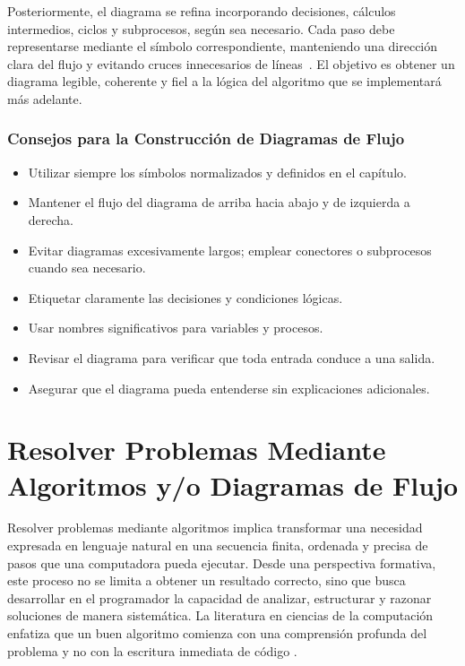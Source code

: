 \documentclass[12pt,twoside]{book}
\begin{document}
							Posteriormente, el diagrama se refina incorporando decisiones, cálculos intermedios, ciclos y subprocesos, según sea necesario. Cada paso debe representarse mediante el símbolo correspondiente, manteniendo una dirección clara del flujo y evitando cruces innecesarios de líneas~\cite{Stevens1974Structured}. El objetivo es obtener un diagrama legible, coherente y fiel a la lógica del algoritmo que se implementará más adelante.
						
						\subsubsection{Consejos para la Construcción de Diagramas de Flujo}
						
							\begin{itemize}
								\item Utilizar siempre los símbolos normalizados y definidos en el capítulo.
								\item Mantener el flujo del diagrama de arriba hacia abajo y de izquierda a derecha.
								\item Evitar diagramas excesivamente largos; emplear conectores o subprocesos cuando sea necesario.
								\item Etiquetar claramente las decisiones y condiciones lógicas.
								\item Usar nombres significativos para variables y procesos.
								\item Revisar el diagrama para verificar que toda entrada conduce a una salida.
								\item Asegurar que el diagrama pueda entenderse sin explicaciones adicionales.
							\end{itemize}
				
				\section{Resolver Problemas Mediante Algoritmos y/o Diagramas de Flujo}
					\noindent
					Resolver problemas mediante algoritmos implica transformar una necesidad expresada en lenguaje natural en una secuencia finita, ordenada y precisa de pasos que una computadora pueda ejecutar. Desde una perspectiva formativa, este proceso no se limita a obtener un resultado correcto, sino que busca desarrollar en el programador la capacidad de analizar, estructurar y razonar soluciones de manera sistemática. La literatura en ciencias de la computación enfatiza que un buen algoritmo comienza con una comprensión profunda del problema y no con la escritura inmediata de código \cite{Gaddis2022Starting, Knuth1997Art}.
					
\end{document}
